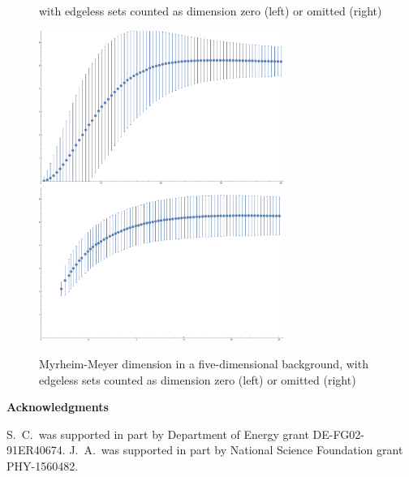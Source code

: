 \documentclass[12pt]{article}
\begin{document}
\begin{figure}
\begin{center}
{with edgeless sets counted as dimension zero (left) or omitted (right) \label{fig3}}
\end{center}
\begin{center}
\includegraphics[width=3.15in]{CSDimRed5D.pdf}
 \includegraphics[width=3.15in]{CSDimRed5D2.pdf}
\caption{Myrheim-Meyer dimension in a five-dimensional background,
with edgeless sets counted as dimension zero (left) or omitted (right) \label{fig4}}
\end{center}
\end{figure}

\newpage

\vspace{1.5ex}
\begin{flushleft}
\large\bf Acknowledgments
\end{flushleft}

S.~C.\ was supported in part by Department of Energy grant DE-FG02-91ER40674.  J.~A.\ was
supported in part by National Science Foundation grant PHY-1560482.
\end{document}
